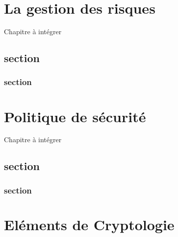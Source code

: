 

\chapter{La gestion des risques}

Chapitre à intégrer 
\section{section}
\subsection{section}

\chapter{Politique de sécurité}

Chapitre à intégrer 
\section{section}
\subsection{section}

\chapter{Eléments de Cryptologie}


